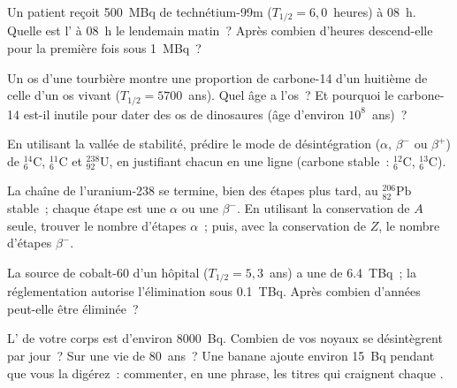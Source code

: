 \begin{exercise}[$\star\star$]\label{exo:g11:nucleus-radioactivity:9}
Un patient reçoit \qty{500}{MBq} de technétium-99m
($T_{1/2} = 6{,}0$~heures) à 08~h. Quelle est l'
 à 08~h le lendemain matin~?
Après combien d'heures descend-elle pour la première fois sous
\qty{1}{MBq}~?
\end{exercise}

\begin{exercise}[$\star\star$]\label{exo:g11:nucleus-radioactivity:10}
Un os d'une tourbière montre une proportion de carbone-14 d'un huitième
de celle d'un os vivant ($T_{1/2} = \num{5700}$~ans). Quel âge a l'os~?
Et pourquoi le carbone-14 est-il inutile pour dater des os de
dinosaures (âge d'environ $10^{8}$~ans)~?
\end{exercise}

\begin{exercise}[$\star\star$]\label{exo:g11:nucleus-radioactivity:11}
En utilisant la vallée de stabilité, prédire le mode de désintégration
($\alpha$, $\beta^-$ ou $\beta^+$) de ${}^{14}_{6}\mathrm{C}$,
${}^{11}_{6}\mathrm{C}$ et ${}^{238}_{92}\mathrm{U}$, en justifiant
chacun en une ligne (carbone stable~: ${}^{12}_{6}\mathrm{C}$,
${}^{13}_{6}\mathrm{C}$).
\end{exercise}

\begin{exercise}[$\star\star\star$]\label{exo:g11:nucleus-radioactivity:12}
La chaîne de l'uranium-238 se termine, bien des étapes plus tard, au
${}^{206}_{82}\mathrm{Pb}$ stable~; chaque étape est une $\alpha$ ou
une $\beta^-$. En utilisant la conservation de $A$ seule, trouver le
nombre d'étapes $\alpha$~; puis, avec la conservation de $Z$, le nombre
d'étapes $\beta^-$.
\end{exercise}

\begin{exercise}[$\star\star\star$]\label{exo:g11:nucleus-radioactivity:13}
La source de cobalt-60 d'un hôpital ($T_{1/2} = 5{,}3$~ans) a une
 de \qty{6.4}{TBq}~; la
réglementation autorise l'élimination sous \qty{0.1}{TBq}. Après combien
d'années peut-elle être éliminée~?
\end{exercise}

\begin{exercise}[$\star\star\star$]\label{exo:g11:nucleus-radioactivity:14}
L' de votre corps est
d'environ \qty{8000}{Bq}. Combien de vos noyaux se désintègrent par
jour~? Sur une vie de $80$~ans~? Une banane ajoute environ \qty{15}{Bq}
pendant que vous la digérez~: commenter, en une phrase, les titres qui
craignent chaque
.
\end{exercise}

